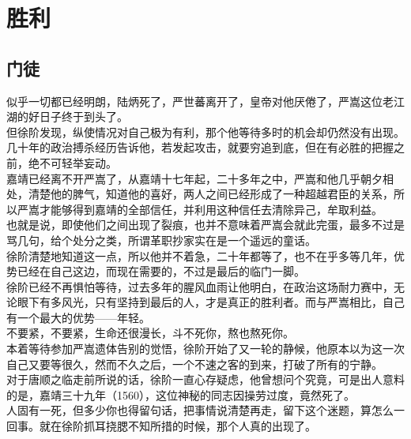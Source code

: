 \section{胜利}
\ifnum{}
	\begin{multicols}{\theparacolNo}
\fi
\subsection{门徒}
似乎一切都已经明朗，陆炳死了，严世蕃离开了，皇帝对他厌倦了，严嵩这位老江湖的好日子终于到头了。\\

但徐阶发现，纵使情况对自己极为有利，那个他等待多时的机会却仍然没有出现。几十年的政治搏杀经历告诉他，若发起攻击，就要穷追到底，但在有必胜的把握之前，绝不可轻举妄动。\\

嘉靖已经离不开严嵩了，从嘉靖十七年起，二十多年之中，严嵩和他几乎朝夕相处，清楚他的脾气，知道他的喜好，两人之间已经形成了一种超越君臣的关系，所以严嵩才能够得到嘉靖的全部信任，并利用这种信任去清除异己，牟取利益。\\

也就是说，即使他们之间出现了裂痕，也并不意味着严嵩会就此完蛋，最多不过是骂几句，给个处分之类，所谓革职抄家实在是一个遥远的童话。\\

徐阶清楚地知道这一点，所以他并不着急，二十年都等了，也不在乎多等几年，优势已经在自己这边，而现在需要的，不过是最后的临门一脚。\\

徐阶已经不再惧怕等待，过去多年的腥风血雨让他明白，在政治这场耐力赛中，无论眼下有多风光，只有坚持到最后的人，才是真正的胜利者。而与严嵩相比，自己有一个最大的优势——年轻。\\

不要紧，不要紧，生命还很漫长，斗不死你，熬也熬死你。\\

本着等待参加严嵩遗体告别的觉悟，徐阶开始了又一轮的静候，他原本以为这一次自己又要等很久，然而不久之后，一个不速之客的到来，打破了所有的宁静。\\

对于唐顺之临走前所说的话，徐阶一直心存疑虑，他曾想问个究竟，可是出人意料的是，嘉靖三十九年（1560），这位神秘的同志因操劳过度，竟然死了。\\

人固有一死，但多少你也得留句话，把事情说清楚再走，留下这个迷题，算怎么一回事。就在徐阶抓耳挠腮不知所措的时候，那个人真的出现了。\\


\end{multicols}
